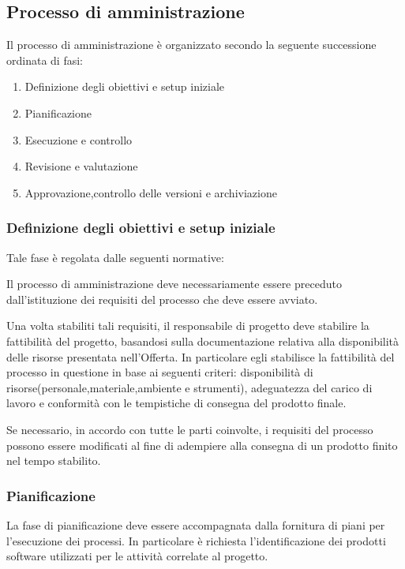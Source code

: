 \subsection{Processo di amministrazione}
Il processo di amministrazione è organizzato secondo la seguente successione ordinata di fasi:

\begin{enumerate}
    \item Definizione degli obiettivi e setup iniziale
    \item Pianificazione
    \item Esecuzione e controllo
    \item Revisione e valutazione
    \item Approvazione,controllo delle versioni e archiviazione
\end{enumerate}

\subsubsection{Definizione degli obiettivi e setup iniziale}
Tale fase è regolata dalle seguenti normative: 

\myparagraph{}Il processo di amministrazione deve necessariamente essere preceduto dall'istituzione dei requisiti del processo che deve essere avviato.

\myparagraph{} Una volta stabiliti tali requisiti, il responsabile di progetto deve stabilire la fattibilità del progetto, basandosi sulla documentazione relativa alla disponibilità delle risorse presentata nell'Offerta. In particolare egli stabilisce la fattibilità del processo in questione in base ai seguenti criteri: disponibilità di risorse(personale,materiale,ambiente e strumenti), adeguatezza del carico di lavoro e conformità con le tempistiche di consegna del prodotto finale.

\myparagraph{} Se necessario, in accordo con tutte le parti coinvolte, i requisiti del processo possono essere modificati al fine di adempiere alla consegna di un prodotto finito nel tempo stabilito. 

\subsubsection{Pianificazione}

\myparagraph{}
La fase di pianificazione deve essere accompagnata dalla fornitura di piani per l'esecuzione dei processi. In particolare è richiesta l'identificazione dei prodotti software utilizzati per le attività correlate al progetto. 

